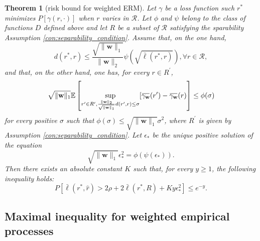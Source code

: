 \documentclass[letterpaper]{article} %
\newtheorem{theorem}{Theorem}
\newcommand{\E}{\mathbb{E}}
\newcommand{\Pro}{P}
\newcommand{\overbar}[1]{\mkern 1.5mu\overline{\mkern-1.5mu#1\mkern-1.5mu}\mkern 1.5mu}
\newcommand*\cen[1]{\overbar{#1}}
\newcommand{\weight}{\mathbf{w}}
\newcommand{\relossf}{\bar{\ell}}
\newcommand{\cenprocess}[1]{\cen{\gamma_{#1}}}
\newcommand{\normo}[1]{\|#1\|_1}
\begin{document}
\begin{theorem}[risk bound for weighted ERM]
    \label{th:weighted_erm_risk_bounds}
    Let $\gamma$ be a loss function such $r^*$ minimizes $\Pro[\gamma(r,\cdot)]$ when $r$ varies in $\mathcal{R}$. Let $\phi$ and $\psi$ belong to the class of functions $D$ defined above and let $R$ be a subset of $\mathcal R$ satisfying the sparability Assumption \ref{con:separability_condition}. Assume that, on the one hand,
    \begin{equation}
        \label{eq:weighted_erm_risk_bound_con1}
        d(r^*,r)\le \frac{\sqrt{\normo{\weight{}}}}{\|\weight{}\|_2}\psi(\sqrt{\relossf(r^*,r)}), \forall r\in \mathcal R,
    \end{equation}
    and that, on the other hand, one has, for every $r\in R^\prime$,
    \begin{equation}
        \label{eq:weighted_erm_risk_bound_con2}
        \sqrt{\normo{\weight{}}}\E\left[\sup_{r'\in R^\prime,\frac{\|\weight{}\|_2}{\sqrt{\normo{\weight{}}}}d(r',r)\le \sigma}[\cenprocess{\weight}(r')-\cenprocess{\weight}(r)\right]\le \phi(\sigma)
    \end{equation}
    for every positive $\sigma$ such that $\phi(\sigma)\le \sqrt{\normo{\weight{}}}\sigma^2$, where $R^\prime$ is given by Assumption \ref{con:separability_condition}. Let $\epsilon_*$ be the unique positive solution of the equation
    \begin{equation}
        \label{eq:risk_bound_con3}
        \sqrt{\normo{\weight{}}}\epsilon_*^2=\phi(\psi(\epsilon_*)).
    \end{equation}
    Then there exists an absolute constant $K$ such that, for every $y\ge 1$, the following inequality holds:
    \begin{equation}
        \label{eq:risk_bound_probability}
        \Pro\left[\relossf(r^*,\hat{r})>2\rho+2\relossf(r^*,R)+K y\epsilon_*^2\right]\le e^{-y}.
    \end{equation}
\end{theorem}


\subsection{Maximal inequality for weighted empirical processes} %
\label{sub:maximal_inequality_for_weighted_processes}

\end{document}

